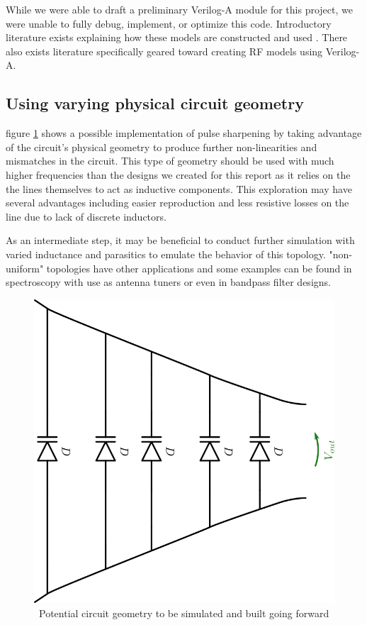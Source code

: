 \documentclass[journal]{IEEEtran} \usepackage[english]{babel}
\begin{document}
While we were able to draft a preliminary Verilog-A module for this project,
we were unable to fully debug, implement, or optimize this code.
Introductory literature exists explaining how these models are constructed
and used \cite{VerilogAFun}. There also exists literature specifically geared
toward creating RF models using Verilog-A\cite{VerilogARF}.
    
    


\subsection{Using varying physical circuit geometry}

figure \ref{fig:WeirdGeo} shows a possible implementation of pulse sharpening by
taking advantage of the circuit's physical geometry to produce further
non-linearities and mismatches in the circuit. This type of geometry should be
used with much higher frequencies than the designs we created for this report as
it relies on the the lines themselves to act as inductive components. This 
exploration may have several advantages including easier reproduction and less
resistive losses on the line due to lack of discrete inductors.

As an intermediate step, it may be beneficial to conduct further simulation with
varied inductance and parasitics to emulate the behavior of this topology.
"non-uniform" topologies have other applications and some examples can be found
in spectroscopy\cite{palmer2014performance} with use as antenna
tuners\cite{cure2012non} or even in bandpass filter
designs\cite{NonUniformBandpass}.


\begin{figure}[htb]
\centering
\includegraphics[width=0.45\linewidth]{WeirdNTLTGeometry.png}
\caption{\ Potential circuit geometry to be simulated and built going forward
}\label{fig:WeirdGeo}
\end{figure}
\end{document}
